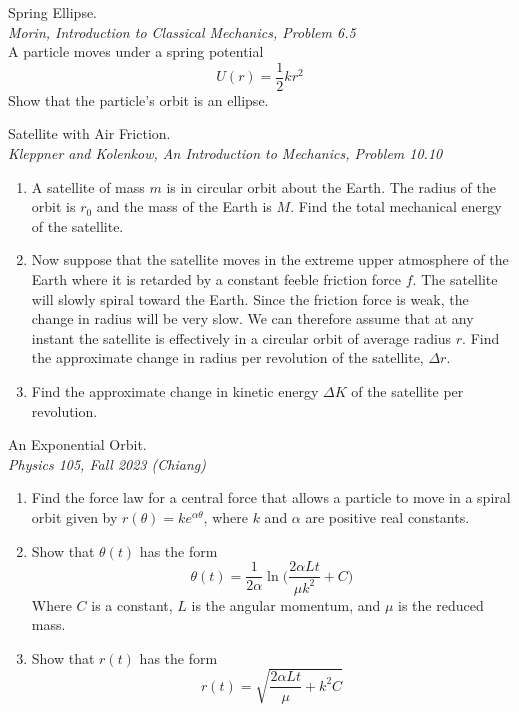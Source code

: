 \documentclass[11pt]{article}
\theoremstyle{gangnamstyle}{\newtheorem{definition}{Definition}[]}
\theoremstyle{gangnamstyle}{\newtheorem{example}{Example}[]}
\theoremstyle{gangnamstyle}{\newtheorem{problem}{Problem}[]}
\theoremstyle{gangnamstyle}{\newtheorem{warning}{Warning}[]}
\begin{document}
\begin{problem}
Spring Ellipse. \\
\textit{Morin, Introduction to Classical Mechanics, Problem 6.5} \\
A particle moves under a spring potential
\[ U(r) = \frac{1}{2} kr^2 \]
Show that the particle’s orbit is an ellipse.
\end{problem}

\begin{problem}
Satellite with Air Friction. \\
\textit{Kleppner and Kolenkow, An Introduction to Mechanics, Problem 10.10}
\begin{enumerate}
\item A satellite of mass $m$ is in circular orbit about the Earth. The radius of the orbit is $r_0$ and the mass of the Earth is $M$. Find the total mechanical energy of the satellite.
\item Now suppose that the satellite moves in the extreme upper atmosphere of the Earth where it is retarded by a constant feeble friction force $f$. The satellite will slowly spiral toward the Earth. Since the friction force is weak, the change in radius will be very slow. We can therefore assume that at any instant the satellite is effectively in a circular orbit of average radius $r$. Find the approximate change in radius per revolution of the satellite, $\Delta r$.
\item Find the approximate change in kinetic energy $\Delta K$ of the satellite per revolution.
\end{enumerate}
\end{problem}

\begin{problem}
An Exponential Orbit. \\
\textit{Physics 105, Fall 2023 (Chiang)}
\begin{enumerate}
\item Find the force law for a central force that allows a particle to move in a spiral orbit given by $r(\theta) = ke^{\alpha \theta}$, where $k$ and $\alpha$ are positive real constants.
\item Show that $\theta(t)$ has the form
\[ \theta(t) = \frac{1}{2\alpha}\ln\Big( \frac{2\alpha L t}{\mu k^2} + C \Big) \]
Where $C$ is a constant, $L$ is the angular momentum, and $\mu$ is the reduced mass. 
\item Show that $r(t)$ has the form
\[ r(t) = \sqrt{\frac{2\alpha L t}{\mu} + k^2C} \]
\end{enumerate}
\end{problem}
\end{document}
